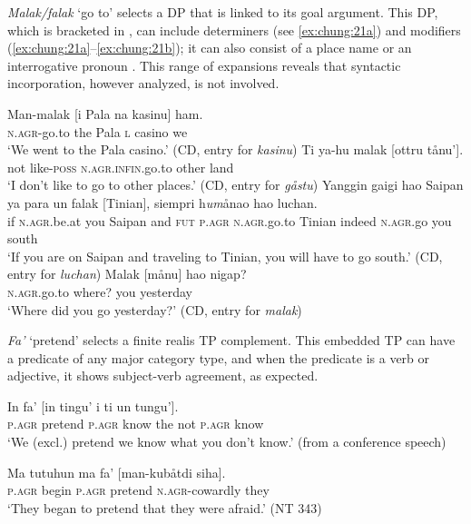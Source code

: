 \documentclass[output=paper,
modfonts
]{LSP/langsci}
\begin{document}
\begin{exe}
\begin{xlist}
\emph{Malak/falak} `go to' selects a DP that is linked to its goal
argument. This DP, which is bracketed in , can include determiners
(see \ref{ex:chung:21a}) and modifiers (\ref{ex:chung:21a}--\ref{ex:chung:21b}); it can also consist of a place name
 or an interrogative pronoun . This range of expansions
reveals that syntactic incorporation, however analyzed, is not involved.

\ea \label{ex:chung:21}
	\ea \label{ex:chung:21a} \gll  Man-malak {[}i Pala na kasinu{]} ham.\\
		\textsc{n.agr-}go.to the Pala \textsc{l} casino we\\
		\glt `We went to the Pala casino.' (CD, entry for \emph{kasinu})
	\ex \label{ex:chung:21b} \gll Ti ya-hu malak {[}ottru tånu'{]}.\\
		not like-\textsc{poss} \textsc{n.agr.infin.}go.to other land\\
		\glt `I don't like to go to other places.' (CD, entry for \emph{gåstu})
	\ex \label{ex:chung:21c} \gll Yanggin gaigi hao Saipan ya para un falak {[}Tinian{]}, siempri h\emph{um}ånao hao luchan.\\
		if \textsc{n.agr.}be.at you Saipan and \textsc{fut} \textsc{p.agr} \textsc{n.agr.}go.to
		Tinian indeed \textsc{n.agr.}go you south\\
		\glt `If you are on Saipan and traveling to Tinian, you will have to go
		south.' (CD, entry for \emph{luchan})
	\ex \label{ex:chung:21d} \gll Malak {[}månu{]} hao nigap?\\
		\textsc{n.agr.}go.to where? you yesterday\\
		\glt `Where did you go yesterday?' (CD, entry for \emph{malak})
	\z
\z

\emph{Fa'} `pretend' selects a finite realis TP complement. This
embedded TP can have a predicate of any major category type, and when
the predicate is a verb or adjective, it shows subject-verb agreement,
as expected.

\ea \label{ex:chung:22}
\ea \label{ex:chung:22a} \gll In fa' {[}in tingu' i ti un tungu'{]}.\\
\textsc{p.agr} pretend \textsc{p.agr} know the not \textsc{p.agr} know\\
\glt `We (excl.) pretend we know what you don't know.' (from a conference speech)

\ex \label{ex:chung:22b} \gll Ma tutuhun ma fa' {[}man-kubåtdi siha{]}.\\
\textsc{p.agr} begin \textsc{p.agr} pretend \textsc{n.agr-}cowardly they\\
\glt `They began to pretend that they were afraid.' (NT 343)


\end{xlist}
\end{exe}
\end{document}
